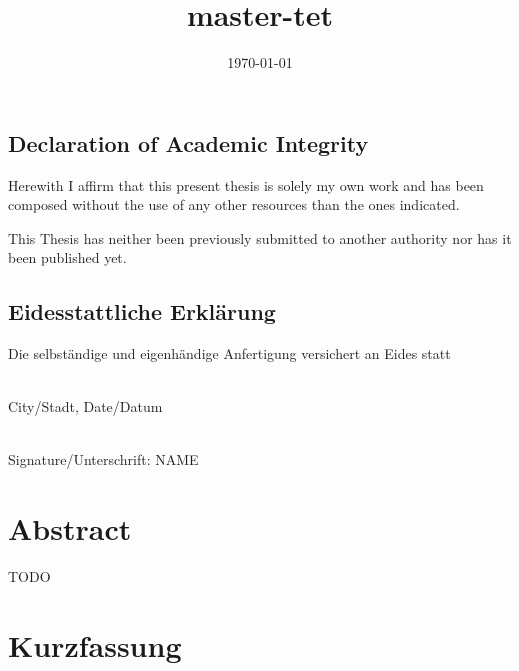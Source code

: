\documentclass[a4paper,twoside,10pt]{book}
\title{master-tet}
\author{}
\date{\today}
\begin{document}
\frontmatter

\tpage

\cleardoublepage

\cleardoublepage
\addtocounter{page}{-2}
\section*{Declaration of Academic Integrity}

Herewith I affirm that this present thesis is solely my own work and has been composed without the use of any other resources than the ones indicated.

\noindent This Thesis has neither been previously submitted to another authority nor has it been published yet.

\section*{Eidesstattliche Erklärung}

\noindent Die selbständige und eigenhändige Anfertigung versichert an Eides statt

\vspace{2cm}

\begin{minipage}{0.5\textwidth}
\noindent\makebox[1pt][l]{\rule{.8\textwidth}{1pt}}\\[3pt]
City/Stadt, Date/Datum
\end{minipage}
\begin{minipage}{0.5\textwidth}
\noindent\makebox[1pt][l]{\rule{.8\textwidth}{1pt}}\\[3pt]
Signature/Unterschrift: NAME
\end{minipage}

\cleardoublepage

\chapter*{Abstract}
TODO

\cleardoublepage

\chapter*{Kurzfassung}
\end{document}
